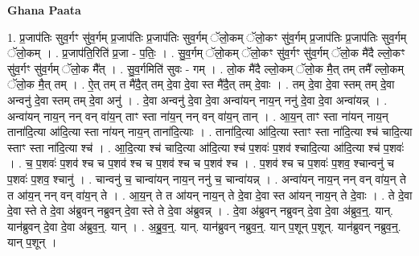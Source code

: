 \documentclass[17pt]{extarticle}
\begin{document}
\textbf{Ghana Paata } \newline

1. प्र॒जाप॑तिः सुव॒र्गꣳ सु॑व॒र्गम् प्र॒जाप॑तिः प्र॒जाप॑तिः सुव॒र्गम् ॅलो॒कम् ॅलो॒कꣳ सु॑व॒र्गम् प्र॒जाप॑तिः प्र॒जाप॑तिः सुव॒र्गम् ॅलो॒कम् । . प्र॒जाप॑ति॒रिति॑ प्र॒जा - प॒तिः॒ । . सु॒व॒र्गम् ॅलो॒कम् ॅलो॒कꣳ सु॑व॒र्गꣳ सु॑व॒र्गम् ॅलो॒क मै॑दै ल्लो॒कꣳ सु॑व॒र्गꣳ सु॑व॒र्गम् ॅलो॒क मै᳚त् । . सु॒व॒र्गमिति॑ सुवः - गम् । . लो॒क मै॑दै ल्लो॒कम् ॅलो॒क मै॒त् तम् तमै᳚ ल्लो॒कम् ॅलो॒क मै॒त् तम् । . ऐ॒त् तम् त मै॑दै॒त् तम् दे॒वा दे॒वा स्त मै॑दै॒त् तम् दे॒वाः । . तम् दे॒वा दे॒वा स्तम् तम् दे॒वा अन्वनु॑ दे॒वा स्तम् तम् दे॒वा अनु॑ । . दे॒वा अन्वनु॑ दे॒वा दे॒वा अन्वा॑यन् नाय॒न् ननु॑ दे॒वा दे॒वा अन्वा॑यन्न् । . अन्वा॑यन् नाय॒न् नन् वन् वा॑य॒न् ताꣳ स्ता ना॑य॒न् नन् वन् वा॑य॒न् तान् । . आ॒य॒न् ताꣳ स्ता ना॑यन् नाय॒न् ताना॑दि॒त्या आ॑दि॒त्या स्ता ना॑यन् नाय॒न् ताना॑दि॒त्याः । . ताना॑दि॒त्या आ॑दि॒त्या स्ताꣳ स्ता ना॑दि॒त्या श्च॑ चादि॒त्या स्ताꣳ स्ता ना॑दि॒त्या श्च॑ । . आ॒दि॒त्या श्च॑ चादि॒त्या आ॑दि॒त्या श्च॑ प॒शवः॑ प॒शव॑ श्चादि॒त्या आ॑दि॒त्या श्च॑ प॒शवः॑ । . च॒ प॒शवः॑ प॒शव॑ श्च च प॒शव॑ श्च च प॒शव॑ श्च च प॒शव॑ श्च । . प॒शव॑ श्च च प॒शवः॑ प॒शव॒ श्चान्वनु॑ च प॒शवः॑ प॒शव॒ श्चानु॑ । . चान्वनु॑ च॒ चान्वा॑यन् नाय॒न् ननु॑ च॒ चान्वा॑यन्न् । . अन्वा॑यन् नाय॒न् नन् वन् वा॑य॒न् ते त आ॑य॒न् नन् वन् वा॑य॒न् ते । . आ॒य॒न् ते त आ॑यन् नाय॒न् ते दे॒वा दे॒वा स्त आ॑यन् नाय॒न् ते दे॒वाः । . ते दे॒वा दे॒वा स्ते ते दे॒वा अ॑ब्रुवन् नब्रुवन् दे॒वा स्ते ते दे॒वा अ॑ब्रुवन्न् । . दे॒वा अ॑ब्रुवन् नब्रुवन् दे॒वा दे॒वा अ॑ब्रुव॒न्॒. यान्. यान॑ब्रुवन् दे॒वा दे॒वा अ॑ब्रुव॒न्॒. यान् । . अ॒ब्रु॒व॒न्॒. यान्. यान॑ब्रुवन् नब्रुव॒न्॒. यान् प॒शून् प॒शून्. यान॑ब्रुवन् नब्रुव॒न्॒. यान् प॒शून् । \newline
\end{document}
